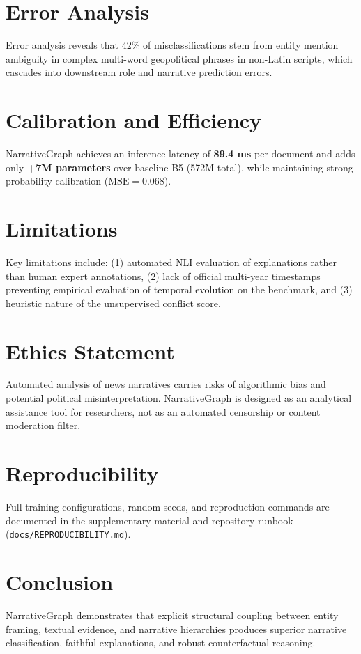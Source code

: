 \documentclass[11pt,a4paper]{article}
\begin{document}
\section{Error Analysis}
Error analysis reveals that $42\%$ of misclassifications stem from entity mention ambiguity in complex multi-word geopolitical phrases in non-Latin scripts, which cascades into downstream role and narrative prediction errors.

\section{Calibration and Efficiency}
NarrativeGraph achieves an inference latency of \textbf{89.4 ms} per document and adds only \textbf{+7M parameters} over baseline B5 (572M total), while maintaining strong probability calibration ($\text{MSE} = 0.068$).

\section{Limitations}
Key limitations include: (1) automated NLI evaluation of explanations rather than human expert annotations, (2) lack of official multi-year timestamps preventing empirical evaluation of temporal evolution on the benchmark, and (3) heuristic nature of the unsupervised conflict score.

\section{Ethics Statement}
Automated analysis of news narratives carries risks of algorithmic bias and potential political misinterpretation. NarrativeGraph is designed as an analytical assistance tool for researchers, not as an automated censorship or content moderation filter.

\section{Reproducibility}
Full training configurations, random seeds, and reproduction commands are documented in the supplementary material and repository runbook (\texttt{docs/REPRODUCIBILITY.md}).

\section{Conclusion}
NarrativeGraph demonstrates that explicit structural coupling between entity framing, textual evidence, and narrative hierarchies produces superior narrative classification, faithful explanations, and robust counterfactual reasoning.
\end{document}
